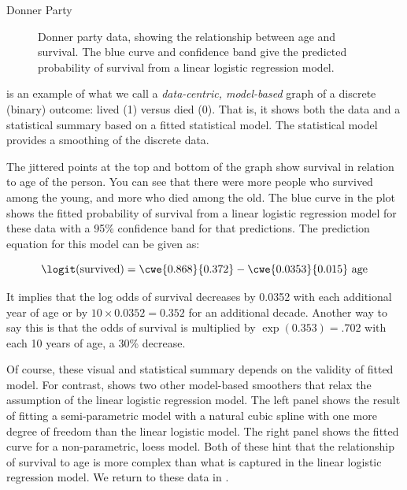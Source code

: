 \documentclass[11pt]{book}
\renewenvironment{knitrout}{\small\renewcommand{\baselinestretch}{.85}}{} %
\begin{document}
\begin{Example}[donner0]{Donner Party}
\begin{knitrout}
\begin{figure}[!htbp]
\caption[Donner party data, showing the relationship between age and survival]{Donner party data, showing the relationship between age and survival. The blue curve and confidence band give the predicted probability of survival from a linear logistic regression model.\label{fig:donner0}}
\end{figure}


\end{knitrout}

 is an example of what we call a \emph{data-centric, model-based}
graph of a discrete (binary) outcome: lived (1) versus died (0). That is, it shows
both the data and a statistical summary based on a fitted statistical model.
The statistical model provides a smoothing of the discrete data.

The jittered points at the top and bottom of the graph show survival in relation
to age of the person.  You can see that there were more people who survived
among the young, and more who died among the old.
The blue curve in the plot shows the fitted probability of survival from
a linear logistic regression model for these data with a 95\% confidence band
for that predictions.  The prediction equation for this model can
be given as:

\begin{equation*}
 \logit ( \mbox{survived} ) =  \cwe{0.868}{0.372} - \cwe{0.0353}{0.015} \mbox{ age} 
 \end{equation*}
 
 It implies that the log odds of survival decreases by 0.0352 with each additional year of
 age or by $10 \times 0.0352 = 0.352$ for an additional decade. 
 Another way to say this is that the odds of survival is multiplied by
 $\exp({0.353}) = .702$ with each 10 years of age, a 30\% decrease.
 
 Of course, these visual and statistical summary depends on the validity of fitted model.
 For contrast,  shows two other model-based smoothers that
 relax the assumption of the linear logistic regression model.
 The left panel shows the result of fitting a semi-parametric model with a 
 natural cubic spline with one more degree of freedom than the linear
 logistic model.  The right panel shows the fitted curve for a non-parametric,
 loess model.  Both of these hint that the relationship of survival to age is
 more complex than what is captured in the linear logistic regression model.
 We return to these data in .
 

\begin{knitrout}
\color{fgcolor}\begin{figure}[!htbp]



\end{figure}
\end{knitrout}
\end{Example}
\end{document}
